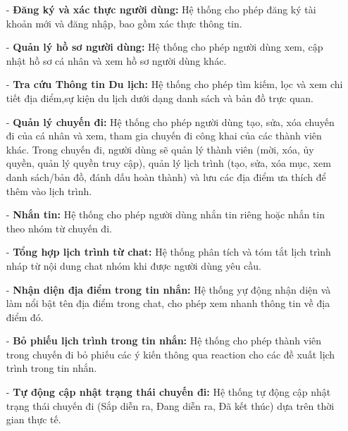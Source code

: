 \begin{itemize}
    \item[-] \textbf{Đăng ký và xác thực người dùng:} Hệ thống cho phép đăng ký tài khoản mới và đăng nhập, bao gồm xác thực thông tin.
    \item[-] \textbf{Quản lý hồ sơ người dùng:} Hệ thống cho phép người dùng xem, cập nhật hồ sơ cá nhân và xem hồ sơ người dùng khác.
    \item[-] \textbf{Tra cứu Thông tin Du lịch:} Hệ thống cho phép tìm kiếm, lọc và xem chi tiết địa điểm,sự kiện du lịch dưới dạng danh sách và bản đồ trực quan.
    \item[-] \textbf{Quản lý chuyến đi:} Hệ thống cho phép người dùng tạo, sửa, xóa chuyến đi của cá nhân và xem, tham gia chuyến đi công khai của các thành viên khác. Trong chuyến đi, người dùng sẽ quản lý thành viên (mời, xóa, ủy quyền, quản lý quyền truy cập), quản lý lịch trình (tạo, sửa, xóa mục, xem danh sách/bản đồ, đánh dấu hoàn thành) và lưu các địa điểm ưa thích để thêm vào lịch trình.
    \item[-] \textbf{Nhắn tin:} Hệ thống cho phép người dùng nhắn tin riêng hoặc nhắn tin theo nhóm từ chuyến đi.
    \item[-] \textbf{Tổng hợp lịch trình từ chat:} Hệ thống phân tích và tóm tắt lịch trình nháp từ nội dung chat nhóm khi được người dùng yêu cầu.
    \item[-] \textbf{Nhận diện địa điểm trong tin nhắn:} Hệ thống yự động nhận diện và làm nổi bật tên địa điểm trong chat, cho phép xem nhanh thông tin về địa điểm đó.
    \item[-] \textbf{Bỏ phiếu lịch trình trong tin nhắn:} Hệ thống cho phép thành viên trong chuyến đi bỏ phiếu các ý kiến thông qua reaction cho các đề xuất lịch trình trong tin nhắn.
    \item[-] \textbf{Tự động cập nhật trạng thái chuyến đi:} Hệ thống tự động cập nhật trạng thái chuyến đi (Sắp diễn ra, Đang diễn ra, Đã kết thúc) dựa trên thời gian thực tế.

\end{itemize}
